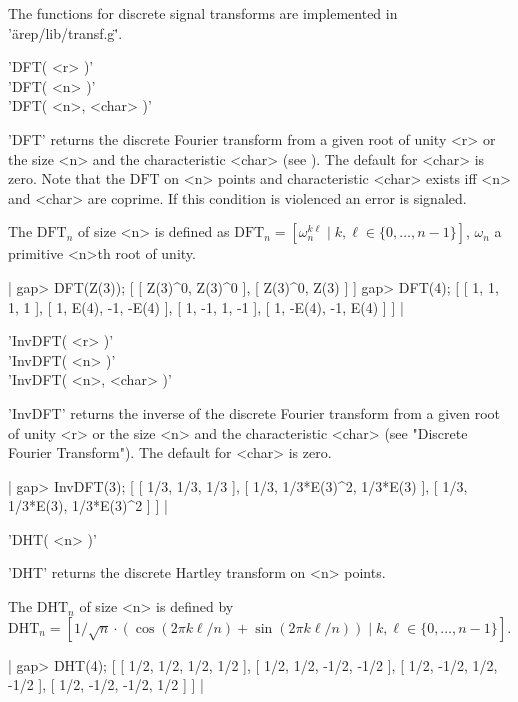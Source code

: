 The functions for discrete signal transforms are implemented
in '\"arep/lib/transf.g\"'.

%
%

'DFT( <r> )'\\
'DFT( <n> )'\\
'DFT( <n>, <char> )'

'DFT' returns the discrete Fourier transform from a given root of unity <r> 
or the size <n> and the characteristic <char> (see \cite{CB93}). 
The default for <char> is zero.
Note that the $\mbox{DFT}$ on <n> points and characteristic <char> exists
iff <n> and <char> are coprime. If this condition is violenced
an error is signaled.

The $\mbox{DFT}_n$ of size <n> is defined as 
$\mbox{DFT}_n = [\omega_n^{k\ell}\mid k,\ell\in\{0,\dots,n-1\}]$, $
\omega_n$ a primitive <n>th root of unity.

|    gap> DFT(Z(3));
    [ [ Z(3)^0, Z(3)^0 ], [ Z(3)^0, Z(3) ] ]
    gap> DFT(4);   
    [ [ 1, 1, 1, 1 ], [ 1, E(4), -1, -E(4) ], [ 1, -1, 1, -1 ], 
      [ 1, -E(4), -1, E(4) ] ] |

%
%

'InvDFT( <r> )'\\
'InvDFT( <n> )'\\
'InvDFT( <n>, <char> )'

'InvDFT' returns the inverse
of the discrete Fourier transform from a given root of unity <r> 
or the size <n> and the characteristic <char> 
(see "Discrete Fourier Transform"). The default for <char> is zero.

|    gap> InvDFT(3);
    [ [ 1/3, 1/3, 1/3 ], [ 1/3, 1/3*E(3)^2, 1/3*E(3) ], 
      [ 1/3, 1/3*E(3), 1/3*E(3)^2 ] ] |

%

'DHT( <n> )'

'DHT' returns the discrete Hartley transform on <n> points.

The $\mbox{DHT}_n$ of size <n> is defined by 
$\mbox{DHT}_n = [1/\sqrt{n}\cdot
(\cos(2\pi k\ell/n) + \sin(2\pi k\ell/n))\mid k,\ell\in\{0,\dots,n-1\}]$.

|    gap> DHT(4);
    [ [ 1/2, 1/2, 1/2, 1/2 ], [ 1/2, 1/2, -1/2, -1/2 ], 
      [ 1/2, -1/2, 1/2, -1/2 ], [ 1/2, -1/2, -1/2, 1/2 ] ] |

